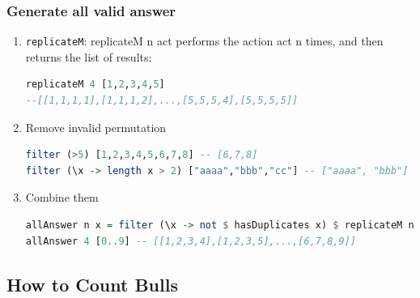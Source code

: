 \documentclass[10pt]{beamer}
\begin{document}


\begin{frame}[fragile]
\frametitle{Generate all valid answer}
\begin{enumerate}[<+->]
    \item \texttt{replicateM}: replicateM n act performs the action act n times, and then returns the list of results:\\ \begin{lstlisting}[language=Haskell,numbers=none]
replicateM 4 [1,2,3,4,5]
--[[1,1,1,1],[1,1,1,2],...,[5,5,5,4],[5,5,5,5]]
    \end{lstlisting}
    \item Remove invalid permutation\\ \begin{lstlisting}[language=Haskell,numbers=none]
filter (>5) [1,2,3,4,5,6,7,8] -- [6,7,8]
filter (\x -> length x > 2) ["aaaa","bbb","cc"] -- ["aaaa", "bbb"]
    \end{lstlisting}
    \item Combine them \begin{lstlisting}[language=Haskell,numbers=none]
allAnswer n x = filter (\x -> not $ hasDuplicates x) $ replicateM n x
allAnswer 4 [0..9] -- [[1,2,3,4],[1,2,3,5],...,[6,7,8,9]]
    \end{lstlisting}
    
\end{enumerate}

\end{frame}



\subsection{How to Count Bulls}

\end{document}
